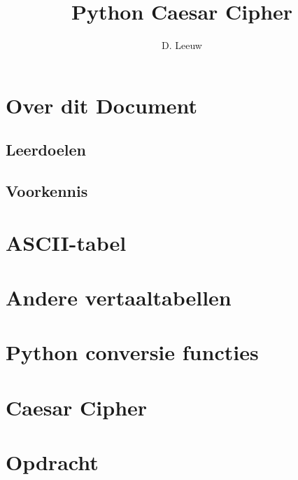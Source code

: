 \documentclass[a4paper,12pt,twoside,openright,titlepage]{article}
\author{D. Leeuw}
\title{Python Caesar Cipher}
\date{\today\\
\vfill
\raggedright
\copyright\ 2020-2025 Dennis Leeuw\\
}
\begin{document}

\maketitle


\section{Over dit Document}
\subsection{Leerdoelen}

\subsection{Voorkennis}
%



\section{ASCII-tabel}




\section{Andere vertaaltabellen}


\section{Python conversie functies}


\section{Caesar Cipher}


\section{Opdracht}


\printindex
\end{document}

